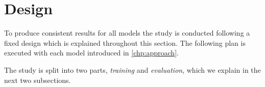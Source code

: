 \section{Design}
\label{chp:study:sec:design}
To produce consistent results for all models the study is conducted following a fixed design which is explained throughout this section.
The following plan is executed with each model introduced in \cref{chp:approach}.

The study is split into two parts, \textit{training} and \textit{evaluation}, which we explain in the next two subsections.



